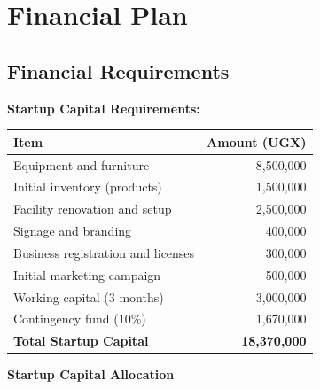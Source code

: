 \section{Financial Plan}

\subsection{Financial Requirements}

\textbf{Startup Capital Requirements:}

\begin{tabular}{|l|r|}
\hline
\textbf{Item} & \textbf{Amount (UGX)} \\
\hline
Equipment and furniture & 8,500,000 \\
Initial inventory (products) & 1,500,000 \\
Facility renovation and setup & 2,500,000 \\
Signage and branding & 400,000 \\
Business registration and licenses & 300,000 \\
Initial marketing campaign & 500,000 \\
Working capital (3 months) & 3,000,000 \\
Contingency fund (10\%) & 1,670,000 \\
\hline
\textbf{Total Startup Capital} & \textbf{18,370,000} \\
\hline
\end{tabular}

\vspace{1em}

\begin{center}
\textbf{Startup Capital Allocation}
\vspace{0.5em}

\end{center}

